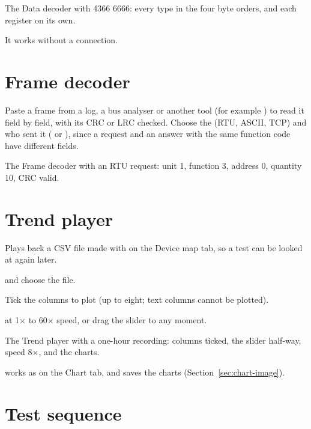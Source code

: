   {The Data decoder with 4366 6666: every type in the four byte orders, and
   each register on its own.}

It works without a connection.

\section{Frame decoder}
\label{sec:frame-decoder}

Paste a frame from a log, a bus analyser or another tool (for example
) to read it field by field, with its CRC or LRC
checked. Choose the  (RTU, ASCII, TCP) and who sent it
( or ), since a request and an answer with the same
function code have different fields.

  {The Frame decoder with an RTU request: unit 1, function 3, address 0,
   quantity 10, CRC valid.}

\section{Trend player}
\label{sec:trend-player}

Plays back a CSV file made with  on the Device map tab, so a test
can be looked at again later.

\begin{steps}
  \item {} and choose the file.
  \item Tick the columns to plot (up to eight; text columns cannot be
        plotted).
  \item {} at 1× to 60× speed, or drag the slider to any moment.
\end{steps}

  {The Trend player with a one-hour recording: columns ticked, the slider
   half-way, speed 8×, and the charts.}

 works as on the Chart tab, and  saves the
charts (Section~\ref{sec:chart-image}).

\section{Test sequence}

